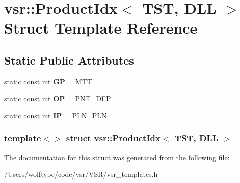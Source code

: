 \hypertarget{structvsr_1_1_product_idx_3_01_t_s_t_00_01_d_l_l_01_4}{\section{vsr\-:\-:Product\-Idx$<$ T\-S\-T, D\-L\-L $>$ Struct Template Reference}
\label{structvsr_1_1_product_idx_3_01_t_s_t_00_01_d_l_l_01_4}
}
\subsection*{Static Public Attributes}
\begin{DoxyCompactItemize}
\item 
\hypertarget{structvsr_1_1_product_idx_3_01_t_s_t_00_01_d_l_l_01_4_ae1eceafdb97dd38ab0262727557804ca}{static const int {\bfseries G\-P} = M\-T\-T}\label{structvsr_1_1_product_idx_3_01_t_s_t_00_01_d_l_l_01_4_ae1eceafdb97dd38ab0262727557804ca}

\item 
\hypertarget{structvsr_1_1_product_idx_3_01_t_s_t_00_01_d_l_l_01_4_a62abc6a5ecd96aa8a215eb69373c1232}{static const int {\bfseries O\-P} = P\-N\-T\-\_\-\-D\-F\-P}\label{structvsr_1_1_product_idx_3_01_t_s_t_00_01_d_l_l_01_4_a62abc6a5ecd96aa8a215eb69373c1232}

\item 
\hypertarget{structvsr_1_1_product_idx_3_01_t_s_t_00_01_d_l_l_01_4_aa5cb3a31b748504a4e880119504b1b08}{static const int {\bfseries I\-P} = P\-L\-N\-\_\-\-P\-L\-N}\label{structvsr_1_1_product_idx_3_01_t_s_t_00_01_d_l_l_01_4_aa5cb3a31b748504a4e880119504b1b08}

\end{DoxyCompactItemize}
\subsubsection*{template$<$$>$ struct vsr\-::\-Product\-Idx$<$ T\-S\-T, D\-L\-L $>$}



The documentation for this struct was generated from the following file\-:\begin{DoxyCompactItemize}
\item 
/\-Users/wolftype/code/vsr/\-V\-S\-R/vsr\-\_\-templates.\-h\end{DoxyCompactItemize}
